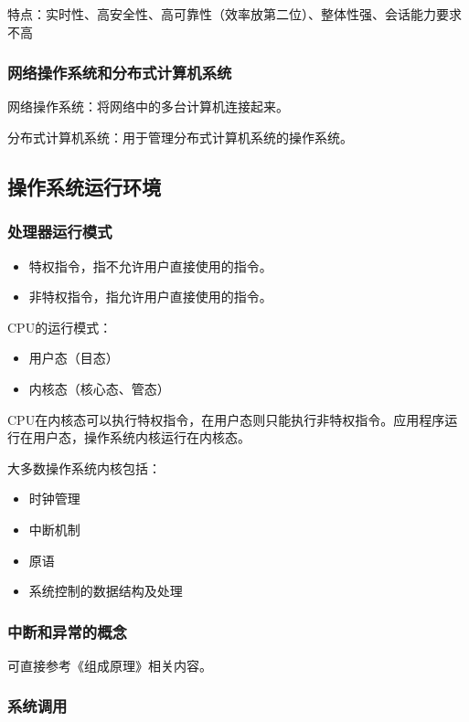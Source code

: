 \documentclass[12pt, a4paper, oneside]{ctexart}
\begin{document}
特点：实时性、高安全性、高可靠性（效率放第二位）、整体性强、会话能力要求不高

\subsubsection{网络操作系统和分布式计算机系统}

网络操作系统：将网络中的多台计算机连接起来。

分布式计算机系统：用于管理分布式计算机系统的操作系统。

\subsection{操作系统运行环境}

\subsubsection{处理器运行模式}

\begin{itemize}
  \item {\kaishu 特权指令}，指不允许用户直接使用的指令。
  \item {\kaishu 非特权指令}，指允许用户直接使用的指令。
\end{itemize}

CPU的运行模式：
\begin{itemize}
  \item {\kaishu 用户态}（目态）
  \item {\kaishu 内核态}（核心态、管态）
\end{itemize}

CPU在内核态可以执行特权指令，在用户态则只能执行非特权指令。应用程序运行在用户态，操作系统内核运行在内核态。

大多数操作系统内核包括：
\begin{itemize}
  \item 时钟管理
  \item 中断机制
  \item 原语
  \item 系统控制的数据结构及处理
\end{itemize}

\subsubsection{中断和异常的概念}

可直接参考《组成原理》相关内容。

\subsubsection{系统调用}
\end{document}
